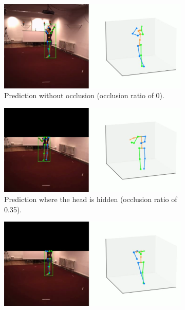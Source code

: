 \documentclass[runningheads]{llncs}
\begin{document}
\begin{figure}[ht]
  \centering
  \begin{subfigure}[t]{0.49\textwidth}
    \centering
    \includegraphics[width=\textwidth]{assets/pred_no_occlusion.png}
    \caption{Prediction without occlusion (occlusion ratio of 0).}
    \label{fig: no occlusion}
  \end{subfigure}
  \hfill
  \begin{subfigure}[t]{0.49\textwidth}
    \centering
    \includegraphics[width=\textwidth]{assets/pred_head_hidden.png}
    \caption{Prediction where the head is hidden (occlusion ratio of 0.35).}
    \label{fig: head hidden}
  \end{subfigure}
  \hfill
  \begin{subfigure}[t]{0.49\textwidth}
    \centering
    \includegraphics[width=\textwidth]{assets/pred_head_hidden_comp.png}

\end{subfigure}
\end{figure}
\end{document}
